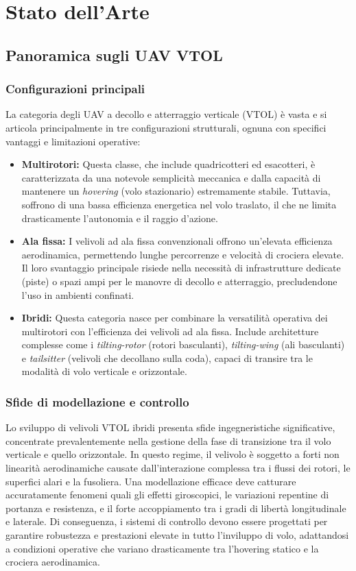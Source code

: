 \documentclass[a4paper,12pt]{article}
\begin{document}
\section{Stato dell'Arte}

\subsection{Panoramica sugli UAV VTOL}

\subsubsection{Configurazioni principali}
La categoria degli UAV a decollo e atterraggio verticale (VTOL) è vasta e si articola principalmente in tre configurazioni strutturali, ognuna con specifici vantaggi e limitazioni operative:
\begin{itemize}
    \item \textbf{Multirotori:} Questa classe, che include quadricotteri ed esacotteri, è caratterizzata da una notevole semplicità meccanica e dalla capacità di mantenere un \textit{hovering} (volo stazionario) estremamente stabile. Tuttavia, soffrono di una bassa efficienza energetica nel volo traslato, il che ne limita drasticamente l'autonomia e il raggio d'azione.
    \item \textbf{Ala fissa:} I velivoli ad ala fissa convenzionali offrono un'elevata efficienza aerodinamica, permettendo lunghe percorrenze e velocità di crociera elevate. Il loro svantaggio principale risiede nella necessità di infrastrutture dedicate (piste) o spazi ampi per le manovre di decollo e atterraggio, precludendone l'uso in ambienti confinati.
    \item \textbf{Ibridi:} Questa categoria nasce per combinare la versatilità operativa dei multirotori con l'efficienza dei velivoli ad ala fissa. Include architetture complesse come i \textit{tilting-rotor} (rotori basculanti), \textit{tilting-wing} (ali basculanti) e \textit{tailsitter} (velivoli che decollano sulla coda), capaci di transire tra le modalità di volo verticale e orizzontale.
\end{itemize}

\subsubsection{Sfide di modellazione e controllo}
Lo sviluppo di velivoli VTOL ibridi presenta sfide ingegneristiche significative, concentrate prevalentemente nella gestione della fase di transizione tra il volo verticale e quello orizzontale. In questo regime, il velivolo è soggetto a forti non linearità aerodinamiche causate dall'interazione complessa tra i flussi dei rotori, le superfici alari e la fusoliera.
Una modellazione efficace deve catturare accuratamente fenomeni quali gli effetti giroscopici, le variazioni repentine di portanza e resistenza, e il forte accoppiamento tra i gradi di libertà longitudinale e laterale. Di conseguenza, i sistemi di controllo devono essere progettati per garantire robustezza e prestazioni elevate in tutto l'inviluppo di volo, adattandosi a condizioni operative che variano drasticamente tra l'hovering statico e la crociera aerodinamica.
\end{document}
